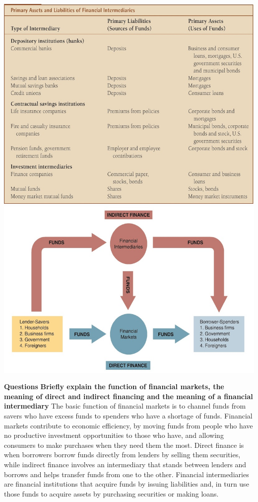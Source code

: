 \documentclass[12pt]{examnotes}
\begin{document}
\begin{center}
  \includegraphics[scale=0.4]{./imgs/2types.jpg}
  \includegraphics[scale=0.4]{./imgs/2finint.jpg}
\end{center}

\textbf{Questions}
\textbf{Briefly explain the function of financial markets, the meaning of direct and indirect financing and the meaning of a financial intermediary}
The basic function of financial markets is to channel funds from savers who have excess funds to spenders who have a shortage of funds. Financial markets contribute to economic efficiency, by moving funds from people who have no productive investment opportunities to those who have, and allowing consumers to make purchases when they need them the most. Direct finance is when borrowers borrow funds directly from lenders by selling them securities, while indirect finance involves an intermediary that stands between lenders and borrows and helps transfer funds from one to the other. Financial intermediaries are financial institutions that acquire funds by issuing liabilities and, in turn use those funds to acquire assets by purchasing securities or making loans.
\end{document}
